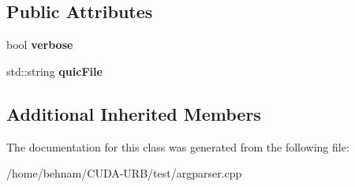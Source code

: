 \subsection*{Public Attributes}
\begin{DoxyCompactItemize}
\item 
\mbox{\label{classMyCommandLineArgs_a2da5f7a2c7df4f7805f8936ebee2a9b3}} 
bool {\bfseries verbose}
\item 
\mbox{\label{classMyCommandLineArgs_afa9d9a970c7abd1275b9387719b0bccf}} 
std\+::string {\bfseries quic\+File}
\end{DoxyCompactItemize}
\subsection*{Additional Inherited Members}


The documentation for this class was generated from the following file\+:\begin{DoxyCompactItemize}
\item 
/home/behnam/\+C\+U\+D\+A-\/\+U\+R\+B/test/argparser.\+cpp\end{DoxyCompactItemize}
